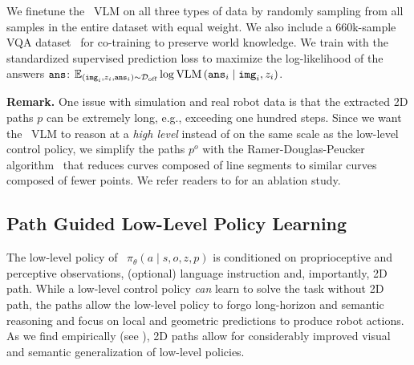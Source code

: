 We finetune the \method\ VLM on all three types of data by randomly sampling from all samples in the entire dataset with equal weight. We also include a 660k-sample VQA dataset~\citep{liu2024improved} for co-training to preserve world knowledge. We train with the standardized supervised prediction loss to maximize the log-likelihood of the answers $\tt ans$:
$\mathbb{E}_{({\tt img}_i, z_i, {\tt ans}_i) \sim \mathcal{D}_\text{off}}  \log \text{VLM} \left( {\tt ans}_i \mid {\tt img}_i, z_i\right)$. 


\textbf{Remark.} One issue with simulation and real robot data is that the extracted 2D paths $p$ can be extremely long, e.g., exceeding one hundred steps. 
Since we want the \method\ VLM to reason at a \emph{high level} instead of on the same scale as the low-level control policy, 
we simplify the paths $p^o$ with the Ramer-Douglas-Peucker algorithm~\citep{RAMER1972244, douglas_pecker_1973} that reduces curves composed of line segments to similar curves composed of fewer points. We refer readers to  for an ablation study.

\subsection{Path Guided Low-Level Policy Learning}
\label{sec:method:policy}
The low-level policy of \method\ $\pi_\theta (a\mid s, o, z, p)$ is conditioned on proprioceptive and perceptive observations, (optional) language instruction and, importantly, 2D path. 
% 
% 
While a low-level control policy \emph{can} learn to solve the task without 2D path, %
the paths allow the low-level policy to forgo long-horizon and semantic reasoning and focus on local and geometric predictions to produce robot actions. As we find empirically (see ), 2D paths allow for considerably improved visual and semantic generalization of low-level policies. 

